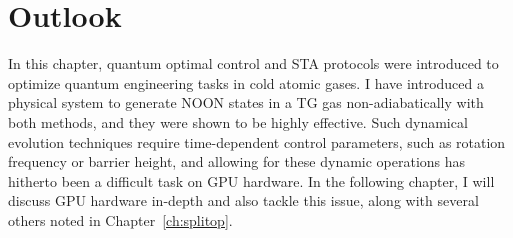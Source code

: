 \section{Outlook}

In this chapter, quantum optimal control and STA protocols were introduced to optimize quantum engineering tasks in cold atomic gases.
I have introduced a physical system to generate NOON states in a TG gas non-adiabatically with both methods, and they were shown to be highly effective.
Such dynamical evolution techniques require time-dependent control parameters, such as rotation frequency or barrier height, and allowing for these dynamic operations has hitherto been a difficult task on GPU hardware.
In the following chapter, I will discuss GPU hardware in-depth and also tackle this issue, along with several others noted in Chapter~\ref{ch:splitop}.

